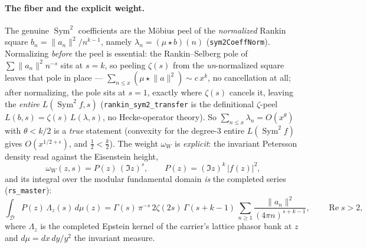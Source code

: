 \documentclass[11pt]{article}
\theoremstyle{definition}
\renewcommand{\Re}{\operatorname{Re}}
\newcommand{\Sym}{\operatorname{Sym}}
\begin{document}
\paragraph{The fiber and the explicit weight.} The genuine $\Sym^2$ coefficients are the M\"obius
peel of the \emph{normalized} Rankin square $b_n=\lVert a_n\rVert^2/n^{k-1}$, namely
$\lambda_n=(\mu\star b)(n)$ (\texttt{sym2CoeffNorm}). Normalizing \emph{before} the peel is
essential: the Rankin--Selberg pole of $\sum\lVert a_n\rVert^2 n^{-s}$ sits at $s=k$, so peeling
$\zeta(s)$ from the \emph{un}-normalized square leaves that pole in place --- $\sum_{n\le x}(\mu\star
\lVert a\rVert^2)\sim c\,x^{k}$, no cancellation at all; after normalizing, the pole sits at $s=1$,
exactly where $\zeta(s)$ cancels it, leaving the \emph{entire} $L(\Sym^2 f,s)$
(\texttt{rankin\_sym2\_transfer} is the definitional $\zeta$-peel $L(b,s)=\zeta(s)\,L(\lambda,s)$,
no Hecke-operator theory). So $\sum_{n\le x}\lambda_n=O(x^{\theta})$ with $\theta<k/2$ is a
\emph{true} statement (convexity for the degree-3 entire $L(\Sym^2 f)$ gives $O(x^{1/2+\epsilon})$,
and $\tfrac12<\tfrac k2$). The weight
$\omega_W$ is \emph{explicit}: the invariant Petersson density read against the Eisenstein height,
\[
  \omega_W(z,s)=P(z)\,(\Im z)^{s},\qquad P(z)=(\Im z)^{k}\,\lvert f(z)\rvert^2 ,
\]
and its integral over the modular fundamental domain \emph{is} the completed series
(\texttt{rs\_master}):
\[
  \int_{\mathcal D} P(z)\,\Lambda_z(s)\,d\mu(z)
   =\Gamma(s)\,\pi^{-s}\,2\zeta(2s)\,\Gamma(s+k-1)\,
    \sum_{n\ge1}\frac{\lVert a_n\rVert^2}{(4\pi n)^{s+k-1}},
    \qquad \Re s>2,
\]
where $\Lambda_z$ is the completed Epstein kernel of the carrier's lattice phasor bank at $z$ and
$d\mu=dx\,dy/y^2$ the invariant measure.
\end{document}
